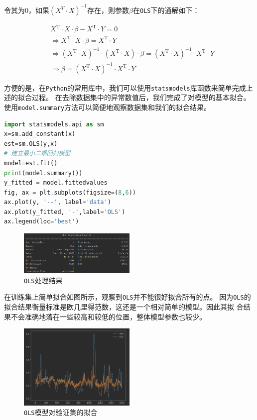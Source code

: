 \documentclass[11pt,a4paper]{elegantpaper}
\begin{document}
\begin{multicols}{2}
令其为0，如果$(X^T\cdot X)^{-1}$存在，则参数$\beta$在\lstinline{OLS}下的通解如下：

$$
\begin{aligned}
&X^{\mathrm{T}} \cdot X \cdot \beta-X^{\mathrm{T}} \cdot Y=0 \\
&\Rightarrow X^{\mathrm{T}} \cdot X \cdot \beta=X^{\mathrm{T}} \cdot Y \\
&\Rightarrow\left(X^{\mathrm{T}} \cdot X\right)^{-1} \cdot\left(X^{\mathrm{T}} \cdot X\right) \cdot \beta=\left(X^{\mathrm{T}} \cdot X\right)^{-1} \cdot X^{\mathrm{T}} \cdot Y \\
&\Rightarrow \beta=\left(X^{\mathrm{T}} \cdot X\right)^{-1} \cdot X^{\mathrm{T}} \cdot Y
\end{aligned}
$$

方便的是，在\lstinline{Python}的常用库中，我们可以使用\lstinline{statsmodels}库函数来简单完成上述的拟合过程。
在去除数据集中的异常数值后，我们完成了对模型的基本拟合。使用\lstinline{model.summary}方法可以简便地观察数据集和我们的拟合结果。

\begin{lstlisting}[language=Python]
import statsmodels.api as sm
x=sm.add_constant(x)
est=sm.OLS(y,x)
# 建立最小二乘回归模型
model=est.fit() 
print(model.summary())
y_fitted = model.fittedvalues
fig, ax = plt.subplots(figsize=(8,6))
ax.plot(y, '--', label='data')
ax.plot(y_fitted, '-',label='OLS')
ax.legend(loc='best')
\end{lstlisting}

\begin{figure}[H]
  \centering
  \includegraphics[width=0.5\textwidth]{images/OLS.png}
  \caption{\lstinline{OLS}处理结果} 
\end{figure}

在训练集上简单拟合如图所示，观察到\lstinline{OLS}并不能很好拟合所有的点。
因为\lstinline{OLS}的拟合结果衡量标准是欧几里得范数，这还是一个相对简单的模型。因此其拟
合结果不会准确地落在一些较高和较低的位置，整体模型参数也较少。

\begin{figure}[H]
  \centering
  \includegraphics[width=0.5\textwidth]{images/F.png}
  \caption{\lstinline{OLS}模型对验证集的拟合} 
\end{figure}


\end{multicols}
\end{document}
